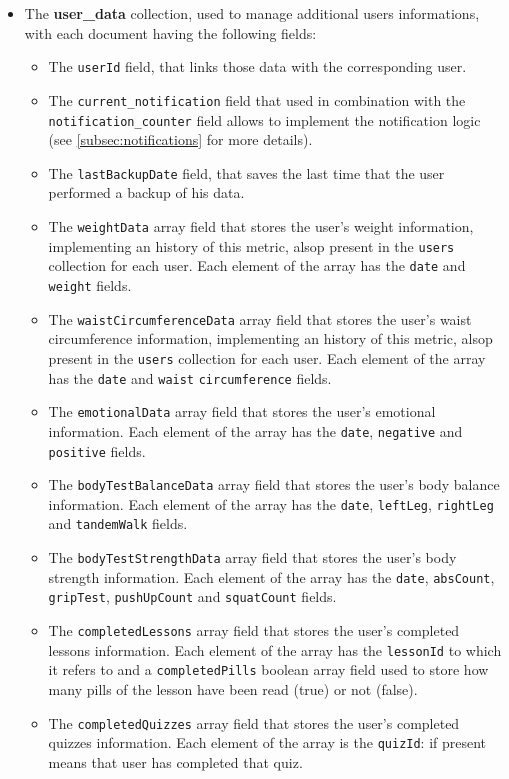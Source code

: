 \begin{itemize}[nosep] %
    \item The \textbf{user\_data} collection, used to manage additional users informations, with each document having the following fields:
    \begin{itemize}[nosep]
        \item The \texttt{userId} field, that links those data with the corresponding user.
        \item The \texttt{current\_notification} field that used in combination with the \newline \texttt{notification\_counter} field allows to implement the notification logic (see \cref{subsec:notifications} for more details).
        \item The \texttt{lastBackupDate} field, that saves the last time that the user performed a backup of his data.
        \item The \texttt{weightData} array field that stores the user's weight information, implementing an history of this metric, alsop present in the \texttt{users} collection for each user. Each element of the array has the \texttt{date} and \texttt{weight} fields.    
        \item The \texttt{waistCircumferenceData} array field that stores the user's waist circumference information, implementing an history of this metric, alsop present in the \texttt{users} collection for each user. Each element of the array has the \texttt{date} and \texttt{waist} \newline \texttt{circumference} fields.
        \item The \texttt{emotionalData} array field that stores the user's emotional information. Each element of the array has the \texttt{date}, \texttt{negative} and \texttt{positive} fields.
        \item The \texttt{bodyTestBalanceData} array field that stores the user's body balance information. Each element of the array has the \texttt{date}, \texttt{leftLeg}, \texttt{rightLeg} and \texttt{tandemWalk} fields.
        \item The \texttt{bodyTestStrengthData} array field that stores the user's body strength information. Each element of the array has the \texttt{date}, \texttt{absCount}, \texttt{gripTest}, \texttt{pushUpCount} and \texttt{squatCount} fields.
        \item The \texttt{completedLessons} array field that stores the user's completed lessons information. Each element of the array has the \texttt{lessonId} to which it refers to and a \texttt{completedPills} boolean array field used to store how many pills of the lesson have been read (true) or not (false).
        \item The \texttt{completedQuizzes} array field that stores the user's completed quizzes information. Each element of the array is the \texttt{quizId}: if present means that user has completed that quiz.
    \end{itemize}
\end{itemize}
